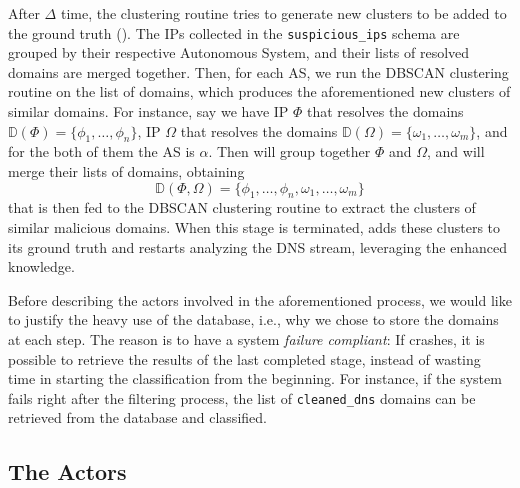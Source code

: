 After $\Delta$ time, the clustering routine tries to generate new clusters to be
added to the ground truth (). The IPs collected in the \texttt{suspicious\_ips}
schema are grouped by their respective
Autonomous System, and their lists of resolved domains are merged together. Then, for each AS, we run the DBSCAN clustering routine on
the list of domains, which produces the aforementioned new clusters of similar
domains. For instance, say we have IP $\Phi$ that resolves the domains
$\mathbb{D}(\Phi) = \{ \phi_1, \ldots, \phi_n \}$, IP $\Omega$ that
resolves the domains $\mathbb{D}(\Omega) = \{ \omega_1, \ldots, \omega_m \}$, and for the both of them the AS is $\alpha$. Then \thesystem will group
together $\Phi$ and $\Omega$, and will merge their lists of domains, obtaining
$$\mathbb{D}(\Phi, \Omega) = \{ \phi_1, \ldots, \phi_n, \omega_1, \ldots, \omega_m \}$$
that is then fed to the DBSCAN clustering routine to extract the clusters of similar malicious domains.
When this stage is terminated, \thesystem adds these clusters to its ground truth
and restarts analyzing the DNS stream, leveraging the enhanced knowledge.

Before describing the actors involved in the aforementioned process, we would
like to justify the heavy use of the database, i.e., why we chose to store the
domains at each step. The reason is to have a system \emph{failure compliant}:
If \thesystem crashes, it is possible to retrieve the results of the last completed
stage, instead of wasting time in starting the classification from the beginning.
For instance, if the system fails right after the filtering process, the list
of \texttt{cleaned\_dns} domains can be retrieved from the database and classified.

\subsection{The Actors} %
\label{sub:the_actors}

